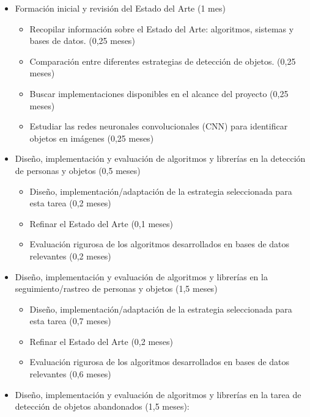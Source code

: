 \begin{itemize}
    \item Formación inicial y revisión del Estado del Arte (1 mes)
  
    \begin{itemize}
        \item Recopilar información sobre el Estado del Arte: algoritmos, sistemas y bases de datos. (0,25 meses)
        \item Comparación entre diferentes estrategias de detección de objetos. (0,25 meses)
        \item Buscar implementaciones disponibles en el alcance del proyecto (0,25 meses)
        \item Estudiar las redes neuronales convolucionales (CNN) para identificar objetos en imágenes (0,25 meses)
    \end{itemize}
  
    \item Diseño, implementación y evaluación de algoritmos y librerías en la detección de personas y objetos (0,5 meses)
  
    \begin{itemize}
        \item Diseño, implementación/adaptación de la estrategia seleccionada para esta tarea (0,2 meses)
        \item Refinar el Estado del Arte (0,1 meses)
        \item Evaluación rigurosa de los algoritmos desarrollados en bases de datos relevantes (0,2 meses)
    \end{itemize}
  
    \item Diseño, implementación y evaluación de algoritmos y librerías en la seguimiento/rastreo de personas y objetos (1,5 meses)
  
    \begin{itemize}
        \item Diseño, implementación/adaptación de la estrategia seleccionada para esta tarea (0,7 meses)
        \item Refinar el Estado del Arte (0,2 meses)
        \item Evaluación rigurosa de los algoritmos desarrollados en bases de datos relevantes (0,6 meses)
    \end{itemize}

    \item Diseño, implementación y evaluación de algoritmos y librerías en la tarea de detección de objetos abandonados (1,5 meses):
  

\end{itemize}
